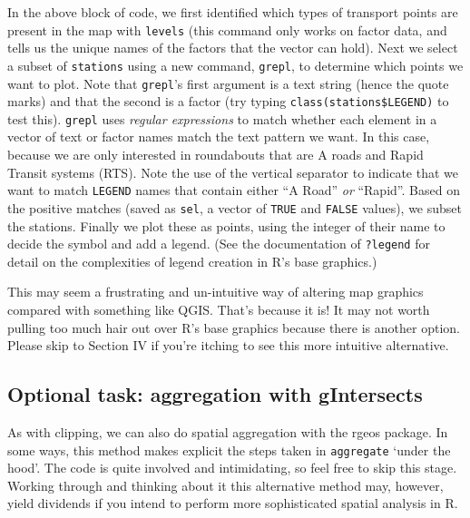 \documentclass[]{article}
\begin{document}
In the above block of code, we first identified which types of transport
points are present in the map with \texttt{levels} (this command only
works on factor data, and tells us the unique names of the factors that
the vector can hold). Next we select a subset of \texttt{stations} using
a new command, \texttt{grepl}, to determine which points we want to
plot. Note that \texttt{grepl}'s first argument is a text string (hence
the quote marks) and that the second is a factor (try typing
\texttt{class(stations\$LEGEND)} to test this). \texttt{grepl} uses
\emph{regular expressions} to match whether each element in a vector of
text or factor names match the text pattern we want. In this case,
because we are only interested in roundabouts that are A roads and Rapid
Transit systems (RTS). Note the use of the vertical separator
\texttt{\textbar{}} to indicate that we want to match \texttt{LEGEND}
names that contain either ``A Road'' \emph{or} ``Rapid''. Based on the
positive matches (saved as \texttt{sel}, a vector of \texttt{TRUE} and
\texttt{FALSE} values), we subset the stations. Finally we plot these as
points, using the integer of their name to decide the symbol and add a
legend. (See the documentation of \texttt{?legend} for detail on the
complexities of legend creation in R's base graphics.)

This may seem a frustrating and un-intuitive way of altering map
graphics compared with something like QGIS. That's because it is! It may
not worth pulling too much hair out over R's base graphics because there
is another option. Please skip to Section IV if you're itching to see
this more intuitive alternative.

\subsection{Optional task: aggregation with
gIntersects}\label{optional-task-aggregation-with-gintersects}

As with clipping, we can also do spatial aggregation with the rgeos
package. In some ways, this method makes explicit the steps taken in
\texttt{aggregate} `under the hood'. The code is quite involved and
intimidating, so feel free to skip this stage. Working through and
thinking about it this alternative method may, however, yield dividends
if you intend to perform more sophisticated spatial analysis in R.
\end{document}
